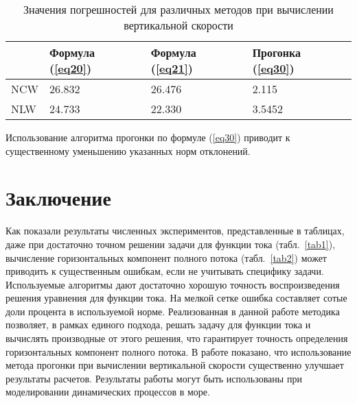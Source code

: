 \documentclass[press]{vestnik}
\begin{document}
\begin{table}
\caption{Значения погрешностей для различных методов при вычислении 
вертикальной скорости}
\begin{tabularx}{\textwidth}{|P{10mm}|Y|Y|Y|}
\hline
& 
Формула (\ref{eq20})& 
Формула (\ref{eq21})& 
Прогонка (\ref{eq30}) \\
\hline
NCW& 
26.832& 
26.476& 
2.115 \\
\hline
NLW& 
24.733& 
22.330& 
3.5452 \\
\hline
\end{tabularx}
\label{tab3}
\end{table}

Использование алгоритма прогонки по формуле (\ref{eq30}) приводит к существенному 
уменьшению указанных норм отклонений.

\section*{Заключение}

Как показали результаты численных экспериментов, представленные в 
таблицах, даже при достаточно точном решении задачи для функции тока 
(табл.~\ref{tab1}), вычисление горизонтальных компонент полного потока (табл.~\ref{tab2}) 
может приводить к существенным ошибкам, если не учитывать специфику задачи. 
Используемые алгоритмы дают достаточно хорошую точность воспроизведения 
решения уравнения для функции тока. На мелкой сетке ошибка составляет сотые 
доли процента в используемой норме. Реализованная в данной работе методика 
позволяет, в рамках единого подхода, решать задачу для функции тока и 
вычислять производные от этого решения, что гарантирует точность определения 
горизонтальных компонент полного потока. В работе показано, что 
использование метода прогонки при вычислении вертикальной скорости 
существенно улучшает результаты расчетов. Результаты работы могут быть 
использованы при моделировании динамических процессов в море. 
\end{document}
